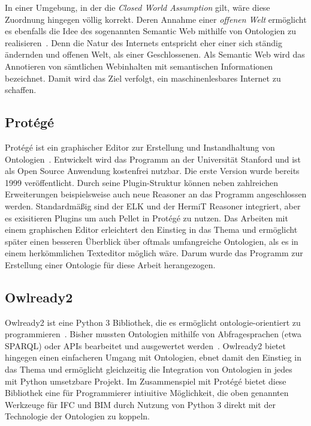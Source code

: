 In einer Umgebung, in der die \textit{Closed World Assumption} gilt, wäre diese Zuordnung hingegen völlig korrekt.
Deren Annahme einer \textit{offenen Welt} ermöglicht es ebenfalls die Idee des sogenannten \glqq{}Semantic Web\grqq{} mithilfe von Ontologien zu realisieren~\cite{SemanticWebLee}.
Denn die Natur des Internets entspricht eher einer sich ständig ändernden und \glqq{}offenen\grqq{} Welt, als einer Geschlossenen.
Als Semantic Web wird das Annotieren von sämtlichen Webinhalten mit semantischen Informationen bezeichnet.
Damit wird das Ziel verfolgt, ein maschinenlesbares Internet zu schaffen. 

\subsection{Protégé}
Protégé ist ein graphischer Editor zur Erstellung und Instandhaltung von Ontologien~\cite{Protege}.
Entwickelt wird das Programm an der Universität Stanford und ist als Open Source Anwendung kostenfrei nutzbar.
Die erste Version wurde bereits 1999 veröffentlicht.
Durch seine Plugin-Struktur können neben zahlreichen Erweiterungen beispielsweise auch neue Reasoner an das Programm angeschlossen werden.
Standardmäßig sind der ELK und der HermiT Reasoner integriert, aber es exisitieren Plugins um auch Pellet in Protégé zu nutzen.
Das Arbeiten mit einem graphischen Editor erleichtert den Einstieg in das Thema und ermöglicht später einen besseren Überblick über oftmals umfangreiche Ontologien, als es in einem herkömmlichen Texteditor möglich wäre.
Darum wurde das Programm zur Erstellung einer Ontologie für diese Arbeit herangezogen.

\subsection{Owlready2}
Owlready2 ist eine Python 3 Bibliothek, die es ermöglicht \glqq{}ontologie-orientiert\grqq{} zu programmieren~\cite{Owlready}.
Bisher mussten Ontologien mithilfe von Abfragesprachen (etwa SPARQL) oder APIs bearbeitet und ausgewertet werden~\cite{SPARQLF_W3C}.
Owlready2 bietet hingegen einen einfacheren Umgang mit Ontologien, ebnet damit den Einstieg in das Thema und ermöglicht gleichzeitig die Integration von Ontologien in jedes mit Python umsetzbare Projekt.
Im Zusammenspiel mit Protégé bietet diese Bibliothek eine für Programmierer intiuitive Möglichkeit, die oben genannten Werkzeuge für IFC und BIM durch Nutzung von Python 3 direkt mit der Technologie der Ontologien zu koppeln.
